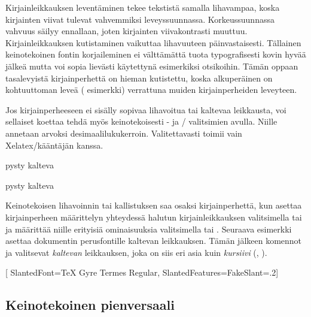 \noindent
Kirjainleikkauksen leventäminen tekee tekstistä samalla lihavampaa,
koska kirjainten viivat tulevat vahvemmiksi leveyssuunnassa.
Korkeussuunnassa vahvuus säilyy ennallaan, joten kirjainten
viivakontrasti muuttuu. Kirjainleikkauksen kutistaminen vaikuttaa
lihavuuteen päinvastaisesti. Tällainen keinotekoinen fontin
korjaileminen ei välttämättä tuota typografisesti kovin hyvää jälkeä
mutta voi sopia lievästi käytettynä esimerkiksi otsikoihin. Tämän oppaan
tasalevyistä kirjainperhettä on hieman kutistettu, koska alkuperäinen on
kohtuuttoman leveä ({\ttfamily{}
  esimerkki}) verrattuna muiden kirjainperheiden leveyteen.

Jos kirjainperheeseen ei sisälly sopivaa lihavoitua tai kaltevaa
leikkausta, voi sellaiset koettaa tehdä myös keinotekoisesti
- ja \-/ valitsimien avulla.
Niille annetaan arvoksi desimaalilukukerroin. Valitettavasti
 toimii vain Xelatex\-/kääntäjän kanssa.

\begin{koodilohkosis}
pysty { kalteva}
\end{koodilohkosis}

\begin{tulossis}
  pysty { kalteva}
\end{tulossis}

\noindent
Keinotekoisen lihavoinnin tai kallistuksen saa osaksi kirjainperhettä,
kun asettaa kirjainperheen määrittelyn yhteydessä halutun
kirjainleikkauksen valitsimella  tai
 ja määrittää niille erityisiä ominaisuuksia
valitsimella  tai .
Seuraava esimerkki asettaa dokumentin perusfontille kaltevan
leikkauksen. Tämän jälkeen komennot  ja
 valitsevat \textsl{kaltevan} leikkauksen, joka on siis
eri asia kuin \textit{kursiivi} (, ).

\begin{koodilohkosis}
\setmainfont{TeX Gyre Termes}[           %
  SlantedFont={TeX Gyre Termes Regular}, %
  SlantedFeatures={FakeSlant=.2}]        %
\end{koodilohkosis}

\subsection{Keinotekoinen pienversaali}
\label{luku/fontit-keinopienversaali}

